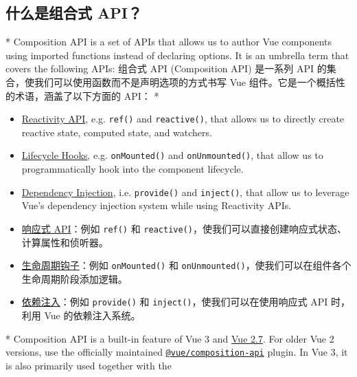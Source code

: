 \begin{paracol}{2}
\subsection{什么是组合式 API？}
\switchcolumn[0]*%
Composition API is a set of APIs that allows us to author Vue components
using imported functions instead of declaring options. It is an umbrella
term that covers the following APIs:
\switchcolumn
组合式 API (Composition API) 是一系列 API
的集合，使我们可以使用函数而不是声明选项的方式书写 Vue
组件。它是一个概括性的术语，涵盖了以下方面的 API：
\switchcolumn[0]*%
\begin{itemize}
\item
  \href{https://vuejs.org/api/reactivity-core.html}{Reactivity API},
  e.g. \texttt{ref()} and \texttt{reactive()}, that allows us to
  directly create reactive state, computed state, and watchers.
\item
  \href{https://vuejs.org/api/composition-api-lifecycle.html}{Lifecycle
  Hooks}, e.g. \texttt{onMounted()} and \texttt{onUnmounted()}, that
  allow us to programmatically hook into the component lifecycle.
\item
  \href{https://vuejs.org/api/composition-api-dependency-injection.html}{Dependency
  Injection}, i.e. \texttt{provide()} and \texttt{inject()}, that allow
  us to leverage Vue's dependency injection system while using
  Reactivity APIs.
\end{itemize}
\switchcolumn
\begin{itemize}
\item
  \href{https://cn.vuejs.org/api/reactivity-core.html}{响应式 API}：例如
  \texttt{ref()} 和
  \texttt{reactive()}，使我们可以直接创建响应式状态、计算属性和侦听器。
\item
  \href{https://cn.vuejs.org/api/composition-api-lifecycle.html}{生命周期钩子}：例如
  \texttt{onMounted()} 和
  \texttt{onUnmounted()}，使我们可以在组件各个生命周期阶段添加逻辑。
\item
  \href{https://cn.vuejs.org/api/composition-api-dependency-injection.html}{依赖注入}：例如
  \texttt{provide()} 和 \texttt{inject()}，使我们可以在使用响应式 API
  时，利用 Vue 的依赖注入系统。
\end{itemize}
\switchcolumn[0]*%
Composition API is a built-in feature of Vue 3 and
\href{https://blog.vuejs.org/posts/vue-2-7-naruto.html}{Vue 2.7}. For
older Vue 2 versions, use the officially maintained
\href{https://github.com/vuejs/composition-api}{\texttt{@vue/composition-api}}
plugin. In Vue 3, it is also primarily used together with the

\end{paracol}
